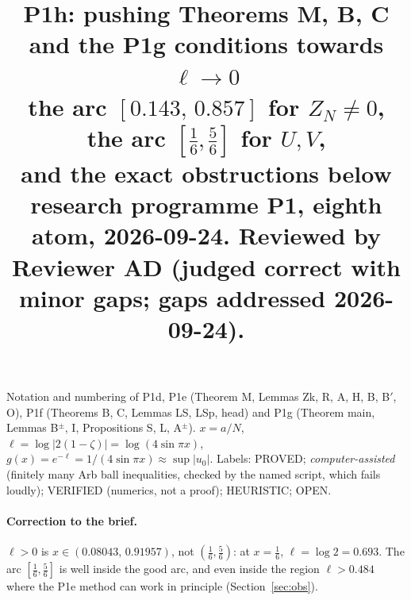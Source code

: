 \documentclass[11pt]{article}
\title{P1h: pushing Theorems M, B, C and the P1g conditions towards $\ell\to0$\\
the arc $[0.143,\,0.857]$ for $Z_N\neq0$, the arc $[\frac16,\frac56]$ for $U,V$,\\ and the exact obstructions below\\
\small research programme P1, eighth atom, 2026-09-24. Reviewed by Reviewer AD (judged correct with minor gaps; gaps addressed 2026-09-24).}
\date{}
\theoremstyle{remark}\newtheorem{remark}[theorem]{Remark}
\begin{document}
\maketitle

Notation and numbering of P1d, P1e (Theorem M, Lemmas Zk, R, A, H, B, B$'$, O), P1f (Theorems B, C, Lemmas LS, LSp, head) and P1g (Theorem main, Lemmas B$^\pm$, I, Propositions S, L, A$^\pm$). $x=a/N$, $\ell=\log|2(1-\zeta)|=\log(4\sin\pi x)$, $g(x)=e^{-\ell}=1/(4\sin\pi x)\approx\sup|u_0|$.
Labels: PROVED; \emph{computer-assisted} (finitely many Arb ball inequalities, checked by the named script, which fails loudly); VERIFIED (numerics, not a proof); HEURISTIC; OPEN.

\paragraph{Correction to the brief.} $\ell>0$ is $x\in(0.08043,\,0.91957)$, not $(\frac16,\frac56)$: at $x=\frac16$, $\ell=\log2=0.693$. The arc $[\frac16,\frac56]$ is well inside the good arc, and even inside the region $\ell>0.484$ where the P1e method can work in principle (Section~\ref{sec:obs}).
\end{document}
